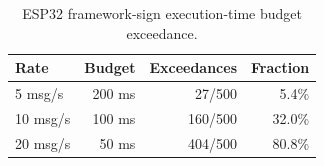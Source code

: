 \begin{table}[t]
\centering
\caption{ESP32 framework-sign execution-time budget exceedance.}
\label{tab:esp32-budget}
\begin{tabular}{lrrr}
\hline
\textbf{Rate} & \textbf{Budget} & \textbf{Exceedances} & \textbf{Fraction} \\
\hline
5 msg/s & 200 ms & 27/500 & 5.4\% \\
10 msg/s & 100 ms & 160/500 & 32.0\% \\
20 msg/s & 50 ms & 404/500 & 80.8\% \\
\hline
\end{tabular}
\end{table}
